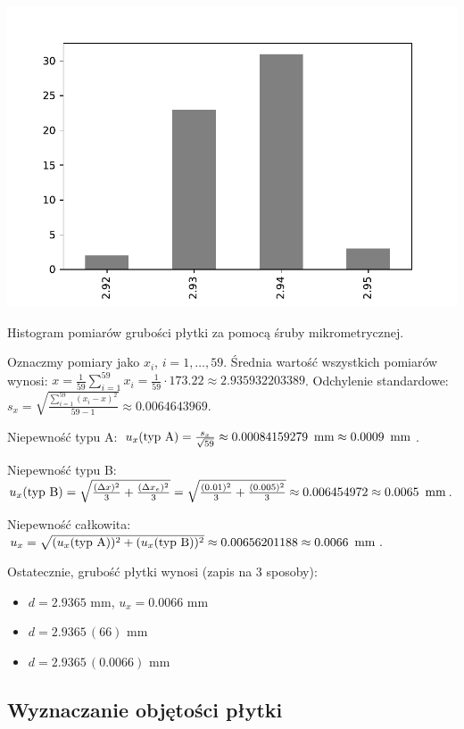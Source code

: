\documentclass[a4paper]{article}
\begin{document}
\begin{table}
\centering
\includegraphics[scale=0.7]{hist.pdf}
\caption{Histogram pomiarów grubości płytki za pomocą śruby mikrometrycznej.}
\end{table}

Oznaczmy pomiary jako $x_i$, $i = 1, \dots, 59$.
Średnia wartość wszystkich pomiarów wynosi: $x = \frac{1}{59} \sum_{i = 1}^{59} x_i = \frac{1}{59} \cdot 173.22 \approx 2.935932203389$.
Odchylenie standardowe: $s_x = \sqrt{\frac{\sum_{i=1}^{59} (x_i - x)^2}{59 - 1}} \approx 0.0064643969$.

Niepewność typu A: $u_x (\text{typ A}) = \frac{s_x}{\sqrt{59}} \approx 0.00084159279 \enskip \text{mm} \approx 0.0009 \enskip \text{mm}$.

Niepewność typu B: $u_x (\text{typ B}) = \sqrt{\frac{(\Delta x)^2}{3} + \frac{(\Delta x_e)^2}{3}} = \sqrt{\frac{(0.01)^2}{3} + \frac{(0.005)^2}{3}} \approx 0.006454972 \approx 0.0065 \enskip \text{mm}$.

Niepewność całkowita: $u_x = \sqrt{(u_x (\text{typ A}))^2 + (u_x (\text{typ B}))^2} \approx 0.00656201188 \approx 0.0066 \enskip \text{mm}$.

Ostatecznie, grubość płytki wynosi (zapis na 3 sposoby):

\begin{itemize}
\item $d = 2.9365$ mm, $u_x = 0.0066$ mm
\item $d = 2.9365 \, (66)$ mm
\item $d = 2.9365 \, (0.0066)$ mm
\end{itemize}

\subsection{Wyznaczanie objętości płytki}
\end{document}
